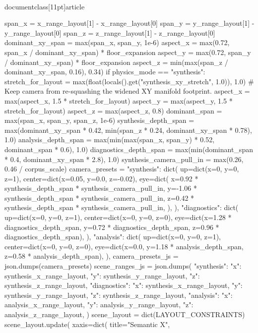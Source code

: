 \\documentclass[11pt]{article}
\begin{document}
\begin{CodeBlock}
{{{{{{    span_x = x_range_layout[1] - x_range_layout[0]
    span_y = y_range_layout[1] - y_range_layout[0]
    span_z = z_range_layout[1] - z_range_layout[0]
    dominant_xy_span = max(span_x, span_y, 1e-6)
    aspect_x = max(0.72, span_x / dominant_xy_span) * floor_expansion
    aspect_y = max(0.72, span_y / dominant_xy_span) * floor_expansion
    aspect_z = min(max(span_z / dominant_xy_span, 0.16), 0.34)
    if physics_mode == "synthesis":
        stretch_for_layout = max(float(locals().get("synthesis_xy_stretch", 1.0)), 1.0)
        # Keep camera from re-squashing the widened XY manifold footprint.
        aspect_x = max(aspect_x, 1.5 * stretch_for_layout)
        aspect_y = max(aspect_y, 1.5 * stretch_for_layout)
        aspect_z = max(aspect_z, 0.8)
    dominant_span = max(span_x, span_y, span_z, 1e-6)
    synthesis_depth_span = max(dominant_xy_span * 0.42, min(span_z * 0.24, dominant_xy_span * 0.78), 1.0)
    analysis_depth_span = max(min(max(span_x, span_y) * 0.52, dominant_span * 0.6), 1.0)
    diagnostics_depth_span = max(min(dominant_span * 0.4, dominant_xy_span * 2.8), 1.0)
    synthesis_camera_pull_in = max(0.26, 0.46 / corpus_scale)
    camera_presets = {
        "synthesis": dict(
            up=dict(x=0, y=0, z=1),
            center=dict(x=0.05, y=0.0, z=-0.02),
            eye=dict(
                x=0.92 * synthesis_depth_span * synthesis_camera_pull_in,
                y=-1.06 * synthesis_depth_span * synthesis_camera_pull_in,
                z=0.42 * synthesis_depth_span * synthesis_camera_pull_in,
            ),
        ),
        "diagnostics": dict(
            up=dict(x=0, y=0, z=1),
            center=dict(x=0, y=0, z=0),
            eye=dict(x=1.28 * diagnostics_depth_span, y=0.72 * diagnostics_depth_span, z=0.96 * diagnostics_depth_span),
        ),
        "analysis": dict(
            up=dict(x=0, y=0, z=1),
            center=dict(x=0, y=0, z=0),
            eye=dict(x=0.0, y=1.18 * analysis_depth_span, z=0.58 * analysis_depth_span),
        ),
    }
    camera_presets_js = json.dumps(camera_presets)
    scene_ranges_js = json.dumps(
        {
            "synthesis": {"x": synthesis_x_range_layout, "y": synthesis_y_range_layout, "z": synthesis_z_range_layout},
            "diagnostics": {"x": synthesis_x_range_layout, "y": synthesis_y_range_layout, "z": synthesis_z_range_layout},
            "analysis": {"x": analysis_x_range_layout, "y": analysis_y_range_layout, "z": analysis_z_range_layout},
        }
    )
    scene_layout = dict(LAYOUT_CONSTRAINTS)
    scene_layout.update(
        xaxis=dict(
            title="Semantic X",
}}}}}}
\end{CodeBlock}
\end{document}
